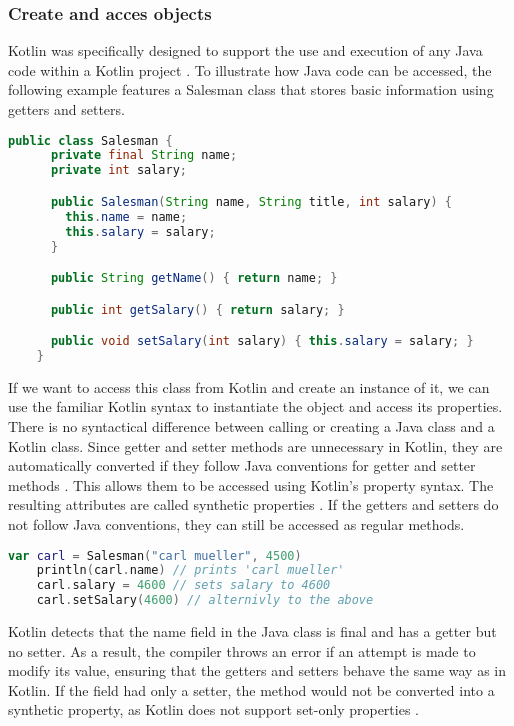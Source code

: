 \documentclass[a4paper, 11pt]{article}
\begin{document}
\subsubsection{Create and acces objects}
  Kotlin was specifically designed to support the use and execution of any Java code within a Kotlin project \cite{interop}. To illustrate how Java code can be accessed, the following example features a Salesman class that stores basic information using getters and setters.
  \begin{lstlisting}[language=Java,title={Example java class}]
    public class Salesman {
      private final String name;
      private int salary;

      public Salesman(String name, String title, int salary) {
        this.name = name;
        this.salary = salary;
      }

      public String getName() { return name; }

      public int getSalary() { return salary; }

      public void setSalary(int salary) { this.salary = salary; }
    }
  \end{lstlisting}
  If we want to access this class from Kotlin and create an instance of it, we can use the familiar Kotlin syntax \cite{interop} to instantiate the object and access its properties. There is no syntactical difference between calling or creating a Java class and a Kotlin class. Since getter and setter methods are unnecessary in Kotlin, they are automatically converted if they follow Java conventions for getter and setter methods \cite{interop-getter-setter}. This allows them to be accessed using Kotlin's property syntax. The resulting attributes are called synthetic properties \cite{interop-synthetic-property}. If the getters and setters do not follow Java conventions, they can still be accessed as regular methods.
  \begin{lstlisting}[language=Kotlin, title={Access the Salesman class in Kotlin}]
    var carl = Salesman("carl mueller", 4500)
    println(carl.name) // prints 'carl mueller'
    carl.salary = 4600 // sets salary to 4600
    carl.setSalary(4600) // alternivly to the above
  \end{lstlisting}
  Kotlin detects that the name field in the Java class is final and has a getter but no setter. As a result, the compiler throws an error if an attempt is made to modify its value, ensuring that the getters and setters behave the same way as in Kotlin. If the field had only a setter, the method would not be converted into a synthetic property, as Kotlin does not support set-only properties \cite{interop-synthetic-property}. %
\end{document}
